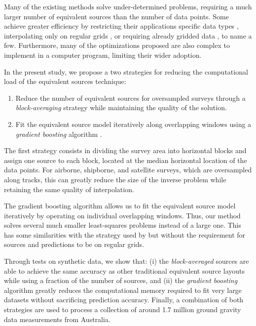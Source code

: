 \documentclass[twocolumn]{article}
\begin{document}
Many of the existing methods solve under-determined problems, requiring a much
larger number of equivalent sources than the number of data points.
Some achieve greater efficiency by restricting their applications
specific data types \citep{siqueira2017},
interpolating only on regular grids \citep{leao1989},
or requiring already gridded data \citep{takahashi2020},
to name a few.
Furthermore, many of the optimizations proposed are also complex to implement
in a computer program, limiting their wider adoption.

In the present study,
we propose a two strategies for reducing the computational load of
the equivalent sources technique:

\begin{enumerate}
    \item Reduce the number of equivalent sources for oversampled surveys
      through a \emph{block-averaging} strategy while maintaining the quality
      of the solution.
    \item Fit the equivalent source model iteratively along overlapping windows
      using a \emph{gradient boosting} algorithm \citep{friedman2001}.
\end{enumerate}

The first strategy consists in dividing the survey area into horizontal blocks
and assign one source to each block, located at the median horizontal location
of the data points. For airborne, shipborne, and satellite surveys, which are
oversampled along tracks, this can greatly reduce the size of the inverse
problem while retaining the same quality of interpolation.

The gradient boosting algorithm allows us to fit the equivalent source model
iteratively by operating on individual overlapping windows.
Thus, our method solves several much smaller least-squares problems instead of
a large one.
This has some similarities with the strategy used by \citet{leao1989} but
without the requirement for sources and predictions to be on regular grids.

Through tests on synthetic data, we show that: (i) the \emph{block-averaged}
sources are able to achieve the same accuracy as other traditional equivalent
source layouts while using a fraction of the number of sources, and (ii) the
\emph{gradient boosting} algorithm greatly reduces the computational memory
required to fit very large datasets without sacrificing prediction accuracy.
Finally, a combination of both strategies are used to process a collection of
around 1.7 million ground gravity data measurements from Australia.
\end{document}
